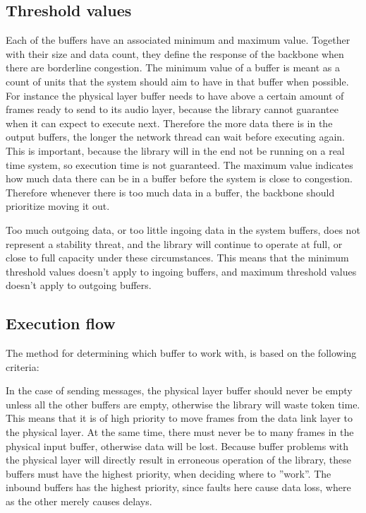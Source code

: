 \subsection{Threshold values}
Each of the buffers have an associated minimum and maximum value. Together with their size and data count, they define the response of the backbone when there are borderline congestion.
The minimum value of a buffer is meant as a count of units that the system should aim to have in that buffer when possible. For instance the physical layer buffer needs to have above a certain amount of frames ready to send to its audio layer, because the library cannot guarantee when it can expect to execute next. Therefore the more data there is in the output buffers, the longer the network thread can wait before executing again. This is important, because the library will in the end not be running on a real time system, so execution time is not guaranteed.
The maximum value indicates how much data there can be in a buffer before the system is close to congestion. Therefore whenever there is too much data in a buffer, the backbone should prioritize moving it out.


Too much outgoing data, or too little ingoing data in the system buffers, does not represent a stability threat, and the library will continue to operate at full, or close to full capacity under these circumstances. This means that the minimum threshold values doesn't apply to ingoing buffers, and maximum threshold values doesn't apply to outgoing buffers.


\subsection{Execution flow}
The method for determining which buffer to work with, is based on the following criteria:

In the case of sending messages, the physical layer buffer should never be empty unless all the other buffers are empty, otherwise the library will waste token time. This means that it is of high priority to move frames from the data link layer to the physical layer.
At the same time, there must never be to many frames in the physical input buffer, otherwise data will be lost. Because buffer problems with the physical layer will directly result in erroneous operation of the library, these buffers must have the highest priority, when deciding where to ''work''. The inbound buffers has the highest priority, since faults here cause data loss, where as the other merely causes delays.

